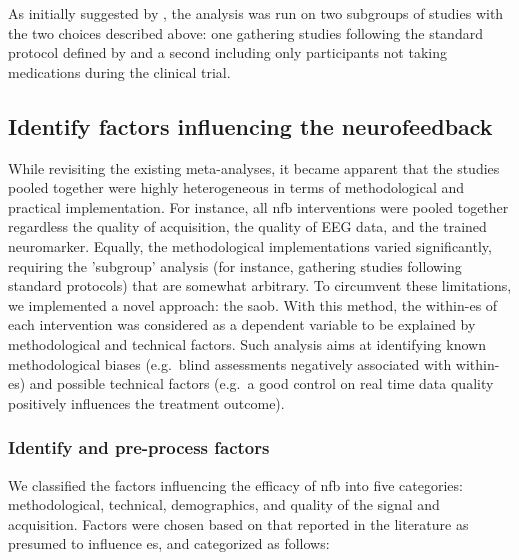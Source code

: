 As initially suggested by \citeauthor{Cortese2016}, the analysis was run on two subgroups of studies 
with the two choices described above: one gathering studies following the standard protocol defined by 
\citet{Arns2014} and a second including only participants not taking medications during the clinical trial.

\subsection{Identify factors influencing the neurofeedback}

While revisiting the existing meta-analyses, it became apparent that the studies pooled together were highly heterogeneous 
in terms of methodological and practical implementation. For instance, all \gls{nfb} 
interventions were pooled together regardless the quality of acquisition, the quality of EEG data, and the trained 
neuromarker. Equally, the methodological implementations varied significantly, requiring the 
'subgroup' analysis (for instance, gathering studies following standard protocols) that are somewhat arbitrary. To circumvent these limitations, we 
implemented a novel approach: the \gls{saob}. With this method, the within-\gls{es} of each intervention was considered 
as a dependent variable to be explained by methodological and technical factors. Such analysis aims at identifying known methodological 
biases (e.g.\ blind assessments negatively associated 
with within-\gls{es}) and possible technical factors (e.g.\ a good control on real time data quality positively influences the 
treatment outcome). 

\subsubsection{Identify and pre-process factors}

We classified the factors influencing the efficacy of \gls{nfb} into five categories: methodological, technical,
demographics, and quality of the signal and acquisition. 
Factors were chosen based on that reported in the literature as presumed to influence \gls{es}, 
and categorized as follows:

